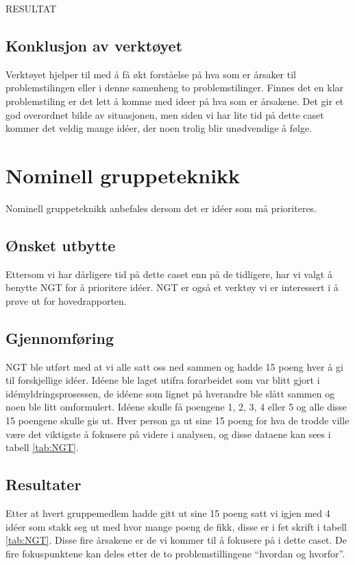 RESULTAT

\subsection{Konklusjon av verktøyet}
Verktøyet hjelper til med å få økt forståelse på hva som er årsaker til problemstilingen eller i denne samenheng to problemstilinger. Finnes det en klar problemstiling er det lett å komme med ideer på hva som er årsakene. Det gir et god overordnet bilde av situasjonen, men siden vi har lite tid på dette caset kommer det veldig mange idéer, der noen trolig blir unødvendige å følge.

\section{Nominell gruppeteknikk}
Nominell gruppeteknikk anbefales dersom det er idéer som må prioriteres. 

\subsection{Ønsket utbytte}
Ettersom vi har dårligere tid på dette caset enn på de tidligere, har vi valgt å benytte NGT for å prioritere idéer. NGT er også et verktøy vi er interessert i å prøve ut for hovedrapporten.

\subsection{Gjennomføring}
NGT ble utført med at vi alle satt oss ned sammen og hadde 15 poeng hver å gi til forskjellige idéer. Idéene ble laget utifra forarbeidet som var blitt gjort i idémyldringsprosessen, de idéene som lignet på hverandre ble slått sammen og noen ble litt omformulert. Idéene skulle få poengene 1, 2, 3, 4 eller 5 og alle disse 15 poengene skulle gis ut. Hver person ga ut sine 15 poeng for hva de trodde ville være det viktigste å fokusere på videre i analysen, og disse dataene kan sees i tabell \ref{tab:NGT}.

\subsection{Resultater}
Etter at hvert gruppemedlem hadde gitt ut sine 15 poeng satt vi igjen med 4 idéer som stakk seg ut med hvor mange poeng de fikk, disse er i fet skrift i tabell \ref{tab:NGT}. Disse fire årsakene er de vi kommer til å fokusere på i dette caset. De fire fokuspunktene kan deles etter de to problemstillingene ``hvordan og hvorfor''.

